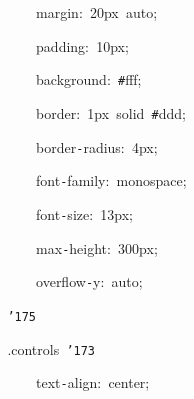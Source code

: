 \documentclass[a4paper,10pt]{article}
\def\mc{\relax}
\begin{document}
\noindent
\mbox{}{\tt\mc \ }{\tt\mc \ }{\tt\mc \ }{\tt\mc \ }{\tt\mc \ }{\tt\mc \ }{\tt\mc \ }{\tt\mc \ }{\tt\mc \ }{\tt\mc \ }{\tt\mc \ }{\tt\mc \ }margin:{\tt\mc \ }20px{\tt\mc \ }auto;

\noindent
\mbox{}{\tt\mc \ }{\tt\mc \ }{\tt\mc \ }{\tt\mc \ }{\tt\mc \ }{\tt\mc \ }{\tt\mc \ }{\tt\mc \ }{\tt\mc \ }{\tt\mc \ }{\tt\mc \ }{\tt\mc \ }padding:{\tt\mc \ }10px;

\noindent
\mbox{}{\tt\mc \ }{\tt\mc \ }{\tt\mc \ }{\tt\mc \ }{\tt\mc \ }{\tt\mc \ }{\tt\mc \ }{\tt\mc \ }{\tt\mc \ }{\tt\mc \ }{\tt\mc \ }{\tt\mc \ }background:{\tt\mc \ }{\tt\#}fff;

\noindent
\mbox{}{\tt\mc \ }{\tt\mc \ }{\tt\mc \ }{\tt\mc \ }{\tt\mc \ }{\tt\mc \ }{\tt\mc \ }{\tt\mc \ }{\tt\mc \ }{\tt\mc \ }{\tt\mc \ }{\tt\mc \ }border:{\tt\mc \ }1px{\tt\mc \ }solid{\tt\mc \ }{\tt\#}ddd;

\noindent
\mbox{}{\tt\mc \ }{\tt\mc \ }{\tt\mc \ }{\tt\mc \ }{\tt\mc \ }{\tt\mc \ }{\tt\mc \ }{\tt\mc \ }{\tt\mc \ }{\tt\mc \ }{\tt\mc \ }{\tt\mc \ }border{\tt -}radius:{\tt\mc \ }4px;

\noindent
\mbox{}{\tt\mc \ }{\tt\mc \ }{\tt\mc \ }{\tt\mc \ }{\tt\mc \ }{\tt\mc \ }{\tt\mc \ }{\tt\mc \ }{\tt\mc \ }{\tt\mc \ }{\tt\mc \ }{\tt\mc \ }font{\tt -}family:{\tt\mc \ }monospace;

\noindent
\mbox{}{\tt\mc \ }{\tt\mc \ }{\tt\mc \ }{\tt\mc \ }{\tt\mc \ }{\tt\mc \ }{\tt\mc \ }{\tt\mc \ }{\tt\mc \ }{\tt\mc \ }{\tt\mc \ }{\tt\mc \ }font{\tt -}size:{\tt\mc \ }13px;

\noindent
\mbox{}{\tt\mc \ }{\tt\mc \ }{\tt\mc \ }{\tt\mc \ }{\tt\mc \ }{\tt\mc \ }{\tt\mc \ }{\tt\mc \ }{\tt\mc \ }{\tt\mc \ }{\tt\mc \ }{\tt\mc \ }max{\tt -}height:{\tt\mc \ }300px;

\noindent
\mbox{}{\tt\mc \ }{\tt\mc \ }{\tt\mc \ }{\tt\mc \ }{\tt\mc \ }{\tt\mc \ }{\tt\mc \ }{\tt\mc \ }{\tt\mc \ }{\tt\mc \ }{\tt\mc \ }{\tt\mc \ }overflow{\tt -}y:{\tt\mc \ }auto;

\noindent
\mbox{}{\tt\mc \ }{\tt\mc \ }{\tt\mc \ }{\tt\mc \ }{\tt\mc \ }{\tt\mc \ }{\tt\mc \ }{\tt\mc \ }{\tt\char'175}

\noindent
\mbox{}{\tt\mc \ }{\tt\mc \ }{\tt\mc \ }{\tt\mc \ }{\tt\mc \ }{\tt\mc \ }{\tt\mc \ }{\tt\mc \ }.controls{\tt\mc \ }{\tt\char'173}

\noindent
\mbox{}{\tt\mc \ }{\tt\mc \ }{\tt\mc \ }{\tt\mc \ }{\tt\mc \ }{\tt\mc \ }{\tt\mc \ }{\tt\mc \ }{\tt\mc \ }{\tt\mc \ }{\tt\mc \ }{\tt\mc \ }text{\tt -}align:{\tt\mc \ }center;
\end{document}

